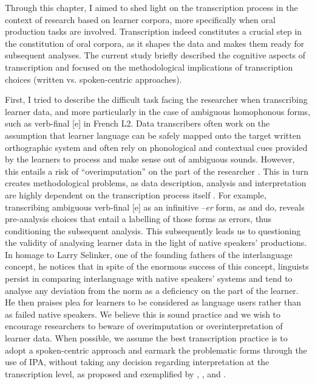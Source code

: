 \documentclass[output=paper,colorlinks,citecolor=brown,modfonts,nonflat]{../langscibook}
\begin{document}
Through this chapter, I aimed to shed light on the transcription process in the context of research based on learner corpora, more specifically when oral production tasks are involved. Transcription indeed constitutes a crucial step in the constitution of oral corpora, as it shapes the data and makes them ready for subsequent analyses. The current study briefly described the cognitive aspects of transcription and focused on the methodological implications of transcription choices (written vs. spoken-centric approaches). 

First, I tried to describe the difficult task facing the researcher when transcribing learner data, and more particularly in the case of ambiguous homophonous forms, such as verb-final [e] in French L2. Data transcribers often work on the assumption that learner language can be safely mapped onto the target written orthographic system and often rely on phonological and contextual cues provided by the learners to process and make sense out of ambiguous sounds. However, this entails a risk of “overimputation” on the part of the researcher \citep{Nickerson1999}. This in turn creates methodological problems, as data description, analysis and interpretation are highly dependent on the transcription process itself \citep{Mondada2007}. For example, transcribing ambiguous verb-final [e] as an infinitive –\textit{er} form, as \citet{Herschensohn2001} and \cite{Prévost2007English,Prévost2007French} do, reveals pre-analysis choices that entail a labelling of those forms as errors, thus conditioning the subsequent analysis. This subsequently leads us to questioning the validity of analysing learner data in the light of native speakers’ productions. In  homage to Larry Selinker, one of the founding fathers of the interlanguage concept, he notices that in spite of the enormous success of this concept, linguists persist in comparing interlanguage with native speakers’ systems and tend to analyse any deviation from the norm as a deficiency on the part of the learner. He then praises  plea for learners to be considered as language users rather than as failed native speakers. We believe this is sound practice and we wish to encourage researchers to beware of overimputation or overinterpretation of learner data. When possible, we assume the best transcription practice is to adopt a spoken-centric approach and earmark the problematic forms through the use of IPA, without taking any decision regarding interpretation at the transcription level, as proposed and exemplified by \citet{Mondada2002}, \cite{Granget2015}, and \citet{Saturno2015}.
\end{document}
